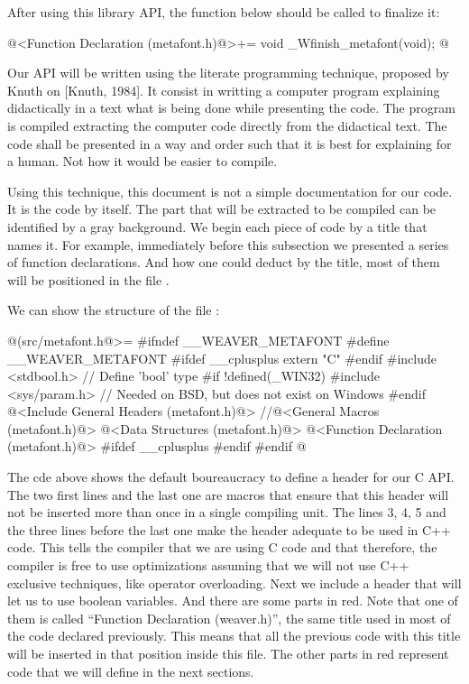 After using this library API, the function below should be called to
finalize it:

\iniciocodigo
@<Function Declaration (metafont.h)@>+=
void _Wfinish_metafont(void);
@
\fimcodigo



Our API will be written using the literate programming technique,
proposed by Knuth on [Knuth, 1984]. It consist in writting a computer
program explaining didactically in a text what is being done while
presenting the code. The program is compiled extracting the computer
code directly from the didactical text. The code shall be presented in
a way and order such that it is best for explaining for a human. Not
how it would be easier to compile.

Using this technique, this document is not a simple documentation for
our code. It is the code by itself. The part that will be extracted to
be compiled can be identified by a gray background. We begin each
piece of code by a title that names it. For example, immediately
before this subsection we presented a series of function
declarations. And how one could deduct by the title, most of them will
be positioned in the file .

We can show the structure of the file :

\iniciocodigo
@(src/metafont.h@>=
#ifndef __WEAVER_METAFONT
#define __WEAVER_METAFONT
#ifdef __cplusplus
extern "C" {
#endif
#include <stdbool.h> // Define  'bool' type
#if !defined(_WIN32)
#include <sys/param.h> // Needed on BSD, but does not exist on Windows
#endif
@<Include General Headers (metafont.h)@>
//@<General Macros (metafont.h)@>
@<Data Structures (metafont.h)@>
@<Function Declaration (metafont.h)@>
#ifdef __cplusplus
}
#endif
#endif
@
\fimcodigo

The cde above shows the default boureaucracy to define a header for
our C API. The two first lines and the last one are macros that ensure
that this header will not be inserted more than once in a single
compiling unit. The lines 3, 4, 5 and the three lines before the last
one make the header adequate to be used in C++ code. This tells the
compiler that we are using C code and that therefore, the compiler is
free to use optimizations assuming that we will not use C++ exclusive
techniques, like operator overloading. Next we include a header that
will let us to use boolean variables. And there are some parts in
red. Note that one of them is called ``Function Declaration
(weaver.h)'', the same title used in most of the code declared
previously. This means that all the previous code with this title will
be inserted in that position inside this file. The other parts in red
represent code that we will define in the next sections.

